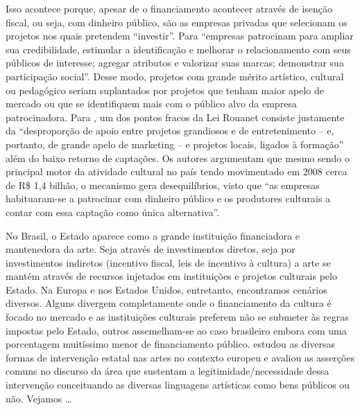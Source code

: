\documentclass[a4paper, 12pt, openright, oneside, german, french, english, brazil]{abntex2}
\begin{document}
	Isso acontece porque, apesar de o financiamento acontecer através de isenção fiscal, ou seja, com dinheiro público, são as empresas privadas que selecionam os projetos nos quais pretendem ``investir''. Para  ``empresas patrocinam para ampliar sua credibilidade, estimular a identificação e melhorar o relacionamento com seus públicos de interesse; agregar atributos e valorizar suas marcas; demonstrar sua participação social''. Desse modo, projetos com grande mérito artístico, cultural ou pedagógico seriam suplantados por projetos que tenham maior apelo de mercado ou que se identifiquem mais com o público alvo da empresa patrocinadora. Para , um dos pontos fracos da Lei Rouanet consiste justamente da ``desproporção de apoio entre projetos grandiosos e de entretenimento -- e, portanto, de grande apelo de marketing -- e projetos locais, ligados à formação'' além do baixo retorno de captações. Os autores argumentam que mesmo sendo o principal motor da atividade cultural no país tendo movimentado em 2008 cerca de R\$ 1,4 bilhão, o mecanismo gera desequilíbrios, visto que ``as empresas habituaram-se a patrocinar com dinheiro público e os produtores culturais a contar com essa captação como única alternativa''\cite[pos. 475]{weiss2009estatais}.
	
	
	
	
	
	No Brasil, o Estado aparece como a grande instituição financiadora e mantenedora da arte. Seja através de investimentos diretos, seja por investimentos indiretos (incentivo fiscal, leis de incentivo à cultura) a arte se mantém através de recursos injetados em instituições e projetos culturais pelo Estado. Na Europa e nos Estados Unidos, entretanto, encontramos cenários diversos. Alguns divergem completamente onde o financiamento da cultura é focado no mercado e as instituições culturais preferem não se submeter às regras impostas pelo Estado, outros assemelham-se ao caso brasileiro embora com uma porcentagem muitíssimo menor de financiamento público.  estudou as diversas formas de intervenção estatal nas artes no contexto europeu e avaliou as asserções comuns no discurso da área que sustentam a legitimidade/necessidade dessa intervenção conceituando as diversas linguagens artísticas como bens públicos ou não. Vejamos \ldots
	
\end{document}
